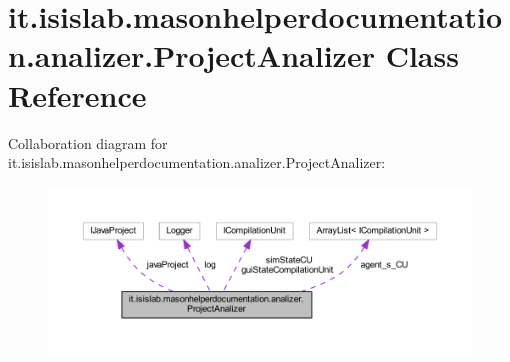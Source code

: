 \hypertarget{classit_1_1isislab_1_1masonhelperdocumentation_1_1analizer_1_1_project_analizer}{\section{it.\-isislab.\-masonhelperdocumentation.\-analizer.\-Project\-Analizer Class Reference}
\label{classit_1_1isislab_1_1masonhelperdocumentation_1_1analizer_1_1_project_analizer}
}


Collaboration diagram for it.\-isislab.\-masonhelperdocumentation.\-analizer.\-Project\-Analizer\-:
\nopagebreak
\begin{figure}[H]
\begin{center}
\leavevmode
\includegraphics[width=350pt]{classit_1_1isislab_1_1masonhelperdocumentation_1_1analizer_1_1_project_analizer__coll__graph}
\end{center}
\end{figure}
